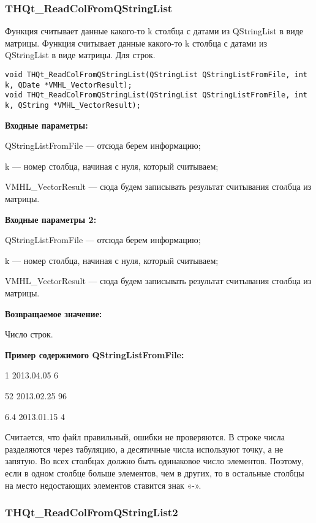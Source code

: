 \documentclass[a4paper,12pt]{article}
\begin{document}
\subsubsection{THQt\_ReadColFromQStringList}\label{THQt_ReadColFromQStringList}

Функция считывает данные какого-то k столбца с датами из QStringList в виде матрицы. Функция считывает данные какого-то k столбца с датами из QStringList в виде матрицы. Для строк.


\begin{lstlisting}[label=code_syntax_THQt_ReadColFromQStringList,caption=Синтаксис]
void THQt_ReadColFromQStringList(QStringList QStringListFromFile, int k, QDate *VMHL_VectorResult);
void THQt_ReadColFromQStringList(QStringList QStringListFromFile, int k, QString *VMHL_VectorResult);
\end{lstlisting}

\textbf{Входные параметры:}

QStringListFromFile --- отсюда берем информацию;
 
    k --- номер столбца, начиная с нуля, который считываем;
 
    VMHL\_VectorResult --- сюда будем записывать результат считывания столбца из матрицы.
	
\textbf{Входные параметры 2:}
	
	 QStringListFromFile --- отсюда берем информацию;
 
    k --- номер столбца, начиная с нуля, который считываем;
 
    VMHL\_VectorResult --- сюда будем записывать результат считывания столбца из матрицы.

\textbf{Возвращаемое значение:}

Число строк.

\textbf{Пример содержимого QStringListFromFile:}

1	2013.04.05	6

52	2013.02.25	96

6.4	2013.01.15	4

Считается, что файл правильный, ошибки не проверяются. В строке числа разделяются через табуляцию, а десятичные числа используют точку, а не запятую. Во всех столбцах должно быть одинаковое число элементов. Поэтому, если в одном столбце больше элементов, чем в других, то в остальные столбцы на место недостающих элементов ставится знак «-».


\subsubsection{THQt\_ReadColFromQStringList2}\label{THQt_ReadColFromQStringList2}
\end{document}
